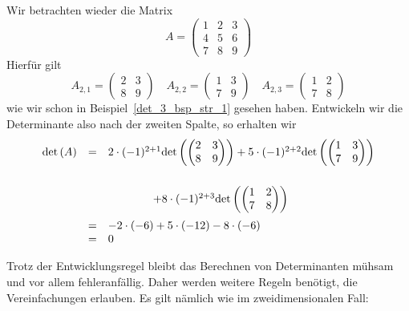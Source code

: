 \begin{beispiel} Wir betrachten wieder die Matrix
  	$$ A = \left( \begin{matrix} 1 & 2 & 3 \\ 4 & 5 & 6 \\ 7 & 8 & 9 \end{matrix} \right) $$
Hierfür gilt
  	$$ A_{2,1} = \left( \begin{matrix} 2 & 3 \\ 8 & 9 \end{matrix} \right) \quad 
   	A_{2,2} = \left( \begin{matrix} 1 & 3 \\ 7 & 9 \end{matrix} \right) \quad
   	A_{2,3} = \left( \begin{matrix} 1 & 2 \\ 7 & 8 \end{matrix} \right) $$
wie wir schon in Beispiel~\ref{det_3_bsp_str_1} gesehen haben. Entwickeln wir die Determinante also 
nach der zweiten Spalte, so erhalten wir
  	$$ \begin{array} {l c l} 
  	\det{A} & = & 2 \cdot (-1)^{2+1} \det{\left( \begin{matrix} 2 & 3 \\ 8 & 9 \end{matrix} \right)}
	+ 5 \cdot (-1)^{2+2} \det{\left( \begin{matrix} 1 & 3 \\ 7 & 9 \end{matrix} \right)} \\
  	& & \qquad \qquad + 8 \cdot (-1)^{2+3} \det{\left( \begin{matrix} 1 & 2 \\ 7 & 8 \end{matrix} \right)} \\
  	& = & - 2 \cdot (-6) + 5 \cdot (-12) - 8 \cdot (-6) \\
  	& = & 0
 	\end{array} $$
\end{beispiel}

\bigbreak

Trotz der Entwicklungsregel bleibt das Berechnen von Determinanten mühsam und vor allem fehleranfällig. 
Daher werden weitere Regeln benötigt, die Vereinfachungen erlauben. Es gilt nämlich wie im zweidimensionalen 
Fall:

